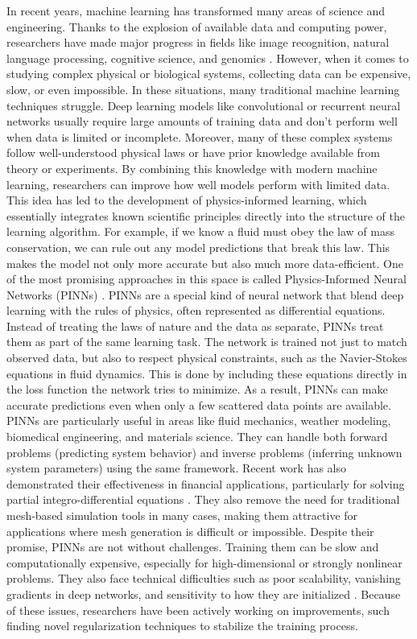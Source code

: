 \documentclass[11pt,twoside,openright]{report}
\begin{document}
In recent years, machine learning has transformed many areas of science and engineering. Thanks to the explosion of available data and computing power, researchers have made major progress in fields like image recognition, natural language processing, cognitive science, and genomics \cite{abadi2016tensorflow}. However, when it comes to studying complex physical or biological systems, collecting data can be expensive, slow, or even impossible. In these situations, many traditional machine learning techniques struggle. Deep learning models like convolutional or recurrent neural networks usually require large amounts of training data and don't perform well when data is limited or incomplete.
Moreover, many of these complex systems follow well-understood physical laws or have prior knowledge available from theory or experiments. By combining this knowledge with modern machine learning, researchers can improve how well models perform with limited data. This idea has led to the development of physics-informed learning, which essentially integrates known scientific principles directly into the structure of the learning algorithm. For example, if we know a fluid must obey the law of mass conservation, we can rule out any model predictions that break this law. This makes the model not only more accurate but also much more data-efficient.
One of the most promising approaches in this space is called Physics-Informed Neural Networks (PINNs) \cite{raissi2019physics}. PINNs are a special kind of neural network that blend deep learning with the rules of physics, often represented as differential equations. Instead of treating the laws of nature and the data as separate, PINNs treat them as part of the same learning task. The network is trained not just to match observed data, but also to respect physical constraints, such as the Navier-Stokes equations in fluid dynamics. This is done by including these equations directly in the loss function the network tries to minimize. As a result, PINNs can make accurate predictions even when only a few scattered data points are available.
PINNs are particularly useful in areas like fluid mechanics, weather modeling, biomedical engineering, and materials science. They can handle both forward problems (predicting system behavior) and inverse problems (inferring unknown system parameters) using the same framework. Recent work has also demonstrated their effectiveness in financial applications, particularly for solving partial integro-differential equations \cite{frey2022deep}. They also remove the need for traditional mesh-based simulation tools in many cases, making them attractive for applications where mesh generation is difficult or impossible.
Despite their promise, PINNs are not without challenges. Training them can be slow and computationally expensive, especially for high-dimensional or strongly nonlinear problems. They also face technical difficulties such as poor scalability, vanishing gradients in deep networks, and sensitivity to how they are initialized \cite{beck2021solving}. Because of these issues, researchers have been actively working on improvements, such finding novel regularization techniques to stabilize the training process.
\end{document}
